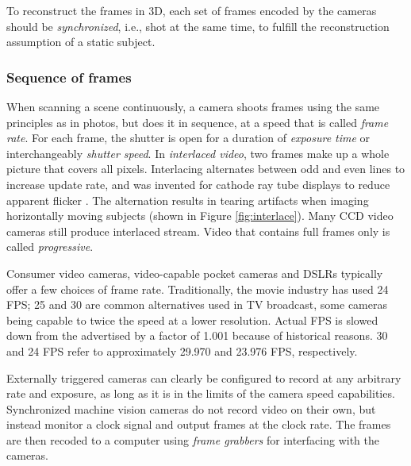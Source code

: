 To reconstruct the frames in 3D, each set of frames encoded by the cameras should be \emph{synchronized}, i.e., shot at the same time, to fulfill the reconstruction assumption of a static subject.


\subsubsection{Sequence of frames} %

When scanning a scene continuously, a camera shoots frames using the same principles as in photos, but does it in sequence, at a speed that is called \emph{frame rate}.
For each frame, the shutter is open for a duration of \emph{exposure time} or interchangeably \emph{shutter speed}.
In \emph{interlaced video}, two frames make up a whole picture that covers all pixels.
Interlacing alternates between odd and even lines to increase update rate, and was invented for cathode ray tube displays to reduce apparent flicker \cite{poynton1996technical}.
The alternation results in tearing artifacts when imaging horizontally moving subjects (shown in Figure \ref{fig:interlace}).
Many CCD video cameras still produce interlaced stream. %
Video that contains full frames only is called \emph{progressive}.



Consumer video cameras, video-capable pocket cameras and DSLRs typically offer a few choices of frame rate. Traditionally, the movie industry has used 24 FPS; 25 and 30 are common alternatives used in TV broadcast, some cameras being capable to twice the speed at a lower resolution.
Actual FPS is slowed down from the advertised by a factor of 1.001 because of historical reasons. %
30 and 24 FPS refer to approximately 29.970 and 23.976 FPS, respectively.
\cite{musburger2010single}

Externally triggered cameras can clearly be configured to record at any arbitrary rate and exposure, as long as it is in the limits of the camera speed capabilities.
Synchronized machine vision cameras do not record video on their own, but instead monitor a clock signal and output frames at the clock rate.
The frames are then recoded to a computer using \emph{frame grabbers} for interfacing with the cameras.
\cite{hornberg2007handbook}


